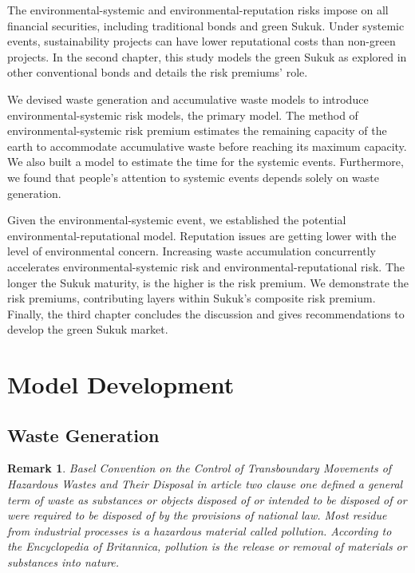 \documentclass[sn-basic]{sn-jnl}%
\theoremstyle{thmstyleone}%
\theoremstyle{thmstyletwo}%
\newtheorem{remark}{Remark}%
\theoremstyle{thmstylethree}%
\begin{document}
The environmental-systemic and environmental-reputation risks impose on all financial securities, including traditional bonds and green Sukuk. Under systemic events, sustainability projects can have lower reputational costs than non-green projects. In the second chapter, this study models the green Sukuk as explored in other conventional bonds and details the risk premiums' role.

We devised waste generation and accumulative waste models to introduce environmental-systemic risk models, the primary model. The method of environmental-systemic risk premium estimates the remaining capacity of the earth to accommodate accumulative waste before reaching its maximum capacity. We also built a model to estimate the time for the systemic events. Furthermore, we found that people's attention to systemic events depends solely on waste generation.

Given the environmental-systemic event, we established the potential environmental-reputational model. Reputation issues are getting lower with the level of environmental concern. Increasing waste accumulation concurrently accelerates environmental-systemic risk and environmental-reputational risk. The longer the Sukuk maturity, is the higher is the risk premium. We demonstrate the risk premiums, contributing layers within Sukuk’s composite risk premium. Finally, the third chapter concludes the discussion and gives recommendations to develop the green Sukuk market.

\section{Model Development}
\subsection{Waste Generation}
\begin{remark}
Basel Convention on the Control of Transboundary Movements of Hazardous Wastes and Their Disposal \citep{law1989basel} in article two clause one defined a general term of waste as \emph{substances or objects disposed of or intended to be disposed of or were required to be disposed of by the provisions of national law}. Most residue from industrial processes is a hazardous material called pollution. According to the Encyclopedia of Britannica, pollution is the release or removal of materials or substances into nature.
\end{remark}
\end{document}

